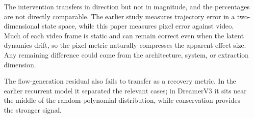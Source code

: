 The intervention transfers in direction but not in magnitude, and the percentages are not directly
comparable. The earlier study measures trajectory error in a two-dimensional state space, while this
paper measures pixel error against video. Much of each video frame is static and can remain correct
even when the latent dynamics drift, so the pixel metric naturally compresses the apparent effect
size. Any remaining difference could come from the architecture, system, or extraction dimension.

The flow-generation residual also fails to transfer as a recovery metric. In the earlier recurrent
model it separated the relevant cases; in DreamerV3 it sits near the middle of the random-polynomial
distribution, while conservation provides the stronger signal.
